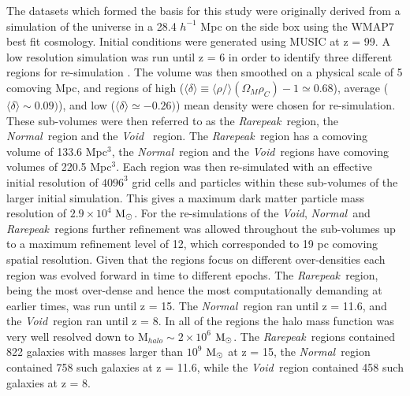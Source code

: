 \documentclass[graphics, twocolumn, usenatbib]{mn2e}
\newcommand{\mpch} {\rm $h^{-1}$ Mpc\,\,}
\newcommand{\msolar} {$\rm{M_{\odot}}~$}
\newcommand{\msolarc} {$\rm{M_{\odot}}$}
\newcommand{\rarepeak} {\textit{Rarepeak~}}
\newcommand{\normal} {\textit{Normal~}}
\newcommand{\void} {\textit{Void~}}
\newcommand{\voidc} {\textit{Void}}
\begin{document}
The datasets which formed the basis for this study were originally derived from a simulation of the
universe in a 28.4 \mpch on the side box using the WMAP7 best fit cosmology. Initial conditions
were generated using MUSIC \citep{Hahn_2011} at z = 99. A low resolution simulation was run until
z = 6 in order to identify three different regions for re-simulation \citep{Chen_2014}. The volume
was then smoothed on a physical scale of 5 comoving Mpc, and regions of high
($\langle\delta\rangle \equiv \langle\rho/\rangle(\Omega_M \rho_C) - 1 \simeq 0.68$),
average ($\langle\delta\rangle \sim 0.09)$), and low ($\langle\delta\rangle \simeq -0.26)$)
 mean density were chosen for re-simulation. 
 These sub-volumes were then referred to as the \rarepeak region, the \normal region  and the \void
 region. The \rarepeak region has a comoving volume of 133.6 Mpc$^3$, the \normal region and
 the \void regions have comoving volumes of 220.5 Mpc$^3$. Each region was then re-simulated with
 an effective initial resolution of $4096^3$ grid cells and particles within these sub-volumes of
 the larger initial simulation. This gives a maximum dark matter particle mass resolution
 of $2.9 \times 10^4$ \msolarc. For the re-simulations of the \voidc, \normal and \rarepeak regions
 further refinement was allowed throughout the sub-volumes up to a maximum refinement level of 12,
 which corresponded to 19 pc comoving spatial resolution. Given that the regions focus on different
 over-densities each region was evolved forward in time to different epochs. The \rarepeak region,
 being the most over-dense and hence the most computationally demanding at earlier times, was run
 until z = 15. The \normal region ran until z = 11.6, and the \void region ran until z = 8. In all
 of the regions the halo mass function was very well resolved down to M$_{halo} \sim 2 \times 10^6$
 \msolarc. The \rarepeak regions contained 822 galaxies with masses larger than $10^9$ \msolar at
 z = 15, the \normal region contained 758 such galaxies at z = 11.6, while the \void region
 contained 458 such galaxies at z = 8. 
\end{document}
